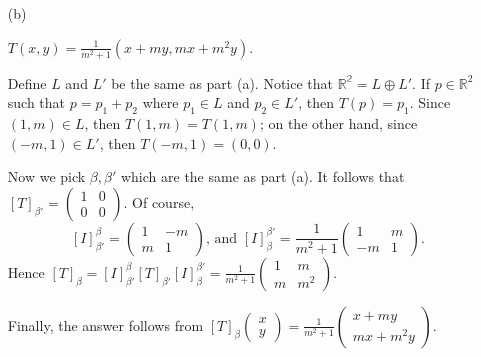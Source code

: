 \begin{Exercise}
\begin{enumerate}[(a)]
		\item[(b)]
		\begin{answer}
			$T(x,y) = \frac{1}{m^2+1}\left(x+m y,m x+m^2 y\right)$.
		\end{answer}
		\begin{solution}
			Define $L$ and $L'$ be the same as part (a). Notice that $\mathbb{R^2} = L\oplus L'$. If $p\in \mathbb{R}^2$ such that $p=p_1+p_2$ where $p_1\in L$ and $p_2\in L'$, then $T(p) = p_1$. Since $(1,m)\in L$, then $T(1,m) = T(1,m)$; on the other hand, since $(-m,1)\in L'$, then $T(-m,1) = (0,0)$. 
			
			Now we pick $\beta,\beta'$ which are the same as part (a). It follows that $[T]_{\beta'} = \begin{pmatrix}
			1 & 0 \\
			0 & 0
			\end{pmatrix}$. Of course, 
			$$
			[I]_{\beta'}^{\beta} = \begin{pmatrix}
			1 & -m \\
			m & 1
			\end{pmatrix}\text{, and } [I]_{\beta}^{\beta'} = \frac{1}{m^2+1}\begin{pmatrix}
			1 & m \\
			-m & 1
			\end{pmatrix}.
			$$
			Hence $[T]_{\beta} = [I]_{\beta'}^{\beta} [T]_{\beta'} [I]_{\beta}^{\beta'} = \frac{1}{m^2+1}\begin{pmatrix}
			1 & m \\
			m & m^2
			\end{pmatrix}$. 
			
			Finally, the answer follows from $[T]_{\beta}\begin{pmatrix}
			x \\
			y
			\end{pmatrix} = \frac{1}{m^2+1}\begin{pmatrix}
			x+m y \\
			m x + m^2 y
			\end{pmatrix}$.
		\end{solution}
		
	\end{enumerate}
\end{Exercise}